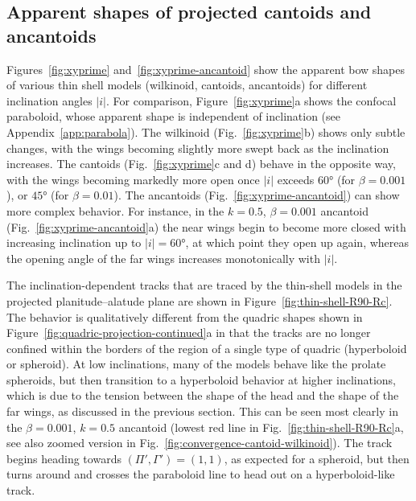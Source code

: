 \documentclass[useAMS, usenatbib, a4paper]{mnras}
\providecommand{\abs}[1]{\lvert#1\rvert}
\begin{document}
\subsection{Apparent shapes of projected cantoids and ancantoids}
\label{sec:proj-shap-cant}

Figures~\ref{fig:xyprime} and~\ref{fig:xyprime-ancantoid} show the
apparent bow shapes of various thin shell models (wilkinoid, cantoids,
ancantoids) for different inclination angles \(\abs{i}\).  For
comparison, Figure~\ref{fig:xyprime}a shows the confocal paraboloid,
whose apparent shape is independent of inclination (see
Appendix~\ref{app:parabola}).  The wilkinoid (Fig.~\ref{fig:xyprime}b)
shows only subtle changes, with the wings becoming slightly more swept
back as the inclination increases.  The cantoids
(Fig.~\ref{fig:xyprime}c and d) behave in the opposite way, with the
wings becoming markedly more open once \(\abs{i}\) exceeds
\(\ang{60}\) (for \(\beta = 0.001\)), or \(\ang{45}\) (for
\(\beta = 0.01\)).  The ancantoids (Fig.~\ref{fig:xyprime-ancantoid}) can
show more complex behavior.  For instance, in the \(k = 0.5\),
\(\beta = 0.001\) ancantoid (Fig.~\ref{fig:xyprime-ancantoid}a) the near
wings begin to become more closed with increasing inclination up to
\(\abs{i} = \ang{60}\), at which point they open up again, whereas the
opening angle of the far wings increases monotonically with
\(\abs{i}\).

The inclination-dependent tracks that are traced by the thin-shell
models in the projected planitude--alatude plane are shown in
Figure~\ref{fig:thin-shell-R90-Rc}.  The behavior is qualitatively
different from the quadric shapes shown in
Figure~\ref{fig:quadric-projection-continued}a in that the tracks are
no longer confined within the borders of the region of a single type
of quadric (hyperboloid or spheroid). At low inclinations, many of the
models behave like the prolate spheroids, but then transition to a
hyperboloid behavior at higher inclinations, which is due to the
tension between the shape of the head and the shape of the far wings,
as discussed in the previous section. This can be seen most clearly in
the \(\beta = 0.001\), \(k = 0.5\) ancantoid (lowest red line in
Fig.~\ref{fig:thin-shell-R90-Rc}a, see also zoomed version in
Fig.~\ref{fig:convergence-cantoid-wilkinoid}). The track begins
heading towards \((\Pi', \Gamma') = (1, 1)\), as expected for a spheroid, but
then turns around and crosses the paraboloid line to head out on a
hyperboloid-like track.
\end{document}
